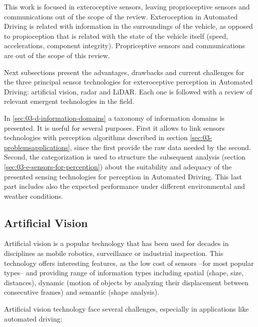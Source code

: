 
This work is focused in exteroceptive sensors, leaving proprioceptive sensors
and communications out of the scope of the review.
Exteroception in Automated Driving is related with information in the
surroundings of the vehicle, as opposed to propioception that is related with 
the state of the vehicle itself (speed, accelerations, component integrity). 
Propriceptive sensors and communications are out of the scope of this review.

Next subsections present the advantages, drawbacks and current challenges for 
the three principal sensor technologies for exteroceptive perception in
Automated Driving: artificial vision, radar and LiDAR. 
Each one is followed with a review of relevant emergent technologies in the
field.

In \ref{sec:03-d-information-domains} a taxonomy of information domains is
presented. It is useful for several purposes. First it allows to 
link sensors technologies with perception algorithms described in section
\ref{sec:03-problemsapplications}, since the first provide the raw data needed
by the second. Second, the categorization is used to structure the subsequent
analysis (section \ref{sec:03-e-sensors-for-perception}) about the suitability
and adequacy of the presented sensing technologies for perception in Automated
Driving. This last part includes also the expected performance under different
environmental and weather conditions.

\subsection{Artificial Vision}
Artificial vision is a popular technology that has been used for decades in 
disciplines as mobile robotics, surveillance or industrial inspection. 
This technology offers interesting features, as the low cost of sensors 
--for most popular types-- and providing range of information types including
spatial (shape, size, distances), dynamic (motion of objects by analyzing their 
displacement between consecutive frames) and semantic (shape analysis).

Artificial vision technology face several challenges, especially in 
applications like automated driving:

